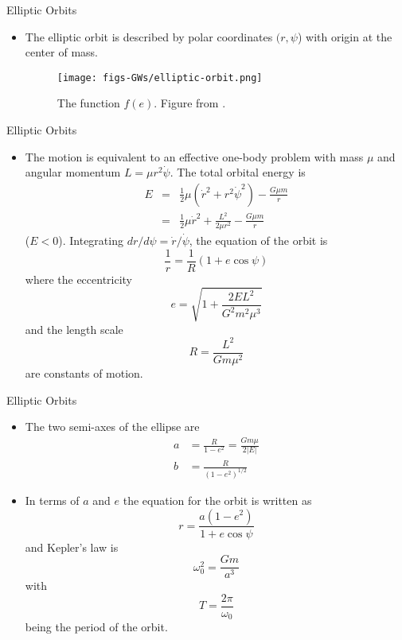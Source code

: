 \documentclass[size=11pt,style=paintings]{powerdot}
\begin{document}
   \begin{slide}{Elliptic Orbits}
 \begin{itemize}
 \item The elliptic orbit is described by polar coordinates $(r,\psi$) with origin
at the center of mass. \begin{figure}
  \centering
   \texttt{[image: figs-GWs/elliptic-orbit.png]}
  \caption{The function $f(e)$. Figure from \cite{2008-Maggiore}.}
\label{fig:polarization}
\end{figure}
 \end{itemize}
 \end{slide}
 
    \begin{slide}{Elliptic Orbits}
 \begin{itemize}
 \item The motion is equivalent to an effective one-body problem with mass $\mu$ and angular momentum $L=\mu r^2\dot\psi$. The total orbital energy  is
\vskip -0.5cm
 \begin{eqnarray} E &=&\frac{1}{2} \mu\left(\dot{r}^{2}+r^{2} \dot{\psi}^{2}\right)-\frac{G \mu m}{r} \\ &=&\frac{1}{2} \mu \dot{r}^{2}+\frac{L^{2}}{2 \mu r^{2}}-\frac{G \mu m}{r} \end{eqnarray}
\vskip -0.2cm
($E<0$). Integrating $d r / d \psi = \dot r/\dot\psi$, the equation of the orbit is
$$\frac{1}{r}=\frac{1}{R}(1+e \cos \psi)$$
\vskip -0.2cm
where the eccentricity 
\vskip -0.3cm$$
e=\sqrt{1+\frac{2 E L^{2}}{G^{2} m^{2} \mu^{3}}}
$$
\vskip -0.2cm
and the length scale
$$
R=\frac{L^{2}}{G m \mu^{2}}
$$
\vskip -0.2cm
are constants of motion.
 \end{itemize}
 \end{slide}
 
   \begin{slide}{Elliptic Orbits}
 \begin{itemize}
 \item The two semi-axes of the ellipse are 
 $$
\begin{aligned} a &=\frac{R}{1-e^{2}} =\frac{G m \mu}{2|E|} \\ b &=\frac{R}{\left(1-e^{2}\right)^{1
/ 2}} \end{aligned}
$$
\vskip -0.2cm
\item In terms of $a$ and $e$ the equation for the orbit is written as 
$$\boxed{r=\frac{a\left(1-e^{2}\right)}{1+e \cos \psi}}$$
and Kepler's law is
\vskip -0.4cm
$$\omega_{0}^{2}=\frac{G m}{a^{3}}$$
with 
\vskip -0.4cm
\begin{equation}
T=\frac{2 \pi}{\omega_{0}}
\end{equation}
being the period of the orbit.
 \end{itemize}
 \end{slide}
 
\end{document}
